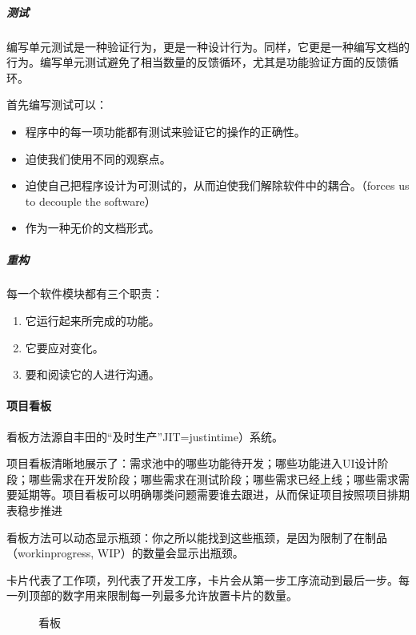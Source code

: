 \documentclass[letterpaper,11pt,english]{sphinxmanual}
\begin{document}
\subparagraph{测试}
\label{\detokenize{chapter_project/Scrum:id14}}
编写单元测试是一种验证行为，更是一种设计行为。同样，它更是一种编写文档的行为。编写单元测试避免了相当数量的反馈循环，尤其是功能验证方面的反馈循环。

首先编写测试可以：
\begin{itemize}
\item {} 
程序中的每一项功能都有测试来验证它的操作的正确性。

\item {} 
迫使我们使用不同的观察点。

\item {} 
迫使自己把程序设计为可测试的，从而迫使我们解除软件中的耦合。（forces
us to decouple the software）

\item {} 
作为一种无价的文档形式。

\end{itemize}


\subparagraph{重构}
\label{\detokenize{chapter_project/Scrum:id15}}
每一个软件模块都有三个职责：
\begin{enumerate}
%
\item {} 
它运行起来所完成的功能。

\item {} 
它要应对变化。

\item {} 
要和阅读它的人进行沟通。

\end{enumerate}


\paragraph{项目看板}
\label{\detokenize{chapter_project/Scrum:id16}}
看板方法源自丰田的“及时生产”JIT=just\sphinxhyphen{}in\sphinxhyphen{}time）系统。

项目看板清晰地展示了：需求池中的哪些功能待开发；哪些功能进入UI设计阶段；哪些需求在开发阶段；哪些需求在测试阶段；哪些需求已经上线；哪些需求需要延期等。项目看板可以明确哪类问题需要谁去跟进，从而保证项目按照项目排期表稳步推进

看板方法可以动态显示瓶颈：你之所以能找到这些瓶颈，是因为限制了在制品（work\sphinxhyphen{}in\sphinxhyphen{}progress,
WIP）的数量会显示出瓶颈。

卡片代表了工作项，列代表了开发工序，卡片会从第一步工序流动到最后一步。每一列顶部的数字用来限制每一列最多允许放置卡片的数量。

\begin{figure}[H]
\centering
\capstart

\noindent{}
\caption{看板}\label{\detokenize{chapter_project/Scrum:id22}}\end{figure}
\end{document}
